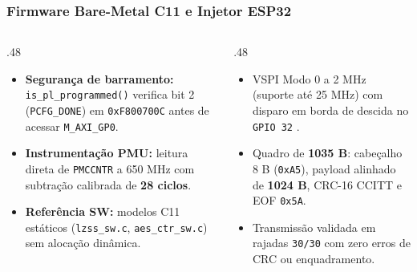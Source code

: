 \documentclass[../main.tex]{subfiles}
\begin{document}
\begin{frame}
  \frametitle{Firmware Bare-Metal C11 e Injetor ESP32}
  \begin{columns}[T]
    \begin{column}{.48\textwidth}
      \begin{itemize}
        \item \textbf{Seguran\c{c}a de barramento:} \texttt{is\_pl\_programmed()} verifica bit 2 (\texttt{PCFG\_DONE}) em \texttt{0xF800700C} antes de acessar \texttt{M\_AXI\_GP0}.
        \item \textbf{Instrumenta\c{c}\~ao PMU:} leitura direta de \texttt{PMCCNTR} a 650 MHz com subtra\c{c}\~ao calibrada de \textbf{28 ciclos}.
        \item \textbf{Refer\^encia SW:} modelos C11 est\'aticos (\texttt{lzss\_sw.c}, \texttt{aes\_ctr\_sw.c}) sem aloca\c{c}\~ao din\^amica.
      \end{itemize}
    \end{column}
    \begin{column}{.48\textwidth}
      \begin{pontoschave}
        \begin{itemize}
          \item VSPI Modo 0 a 2 MHz (suporte at\'e 25 MHz) com disparo em borda de descida no \texttt{GPIO 32} \autocite{EspressifESPIDF}.
          \item Quadro de \textbf{1035 B}: cabe\c{c}alho 8 B (\texttt{0xA5}), payload alinhado de \textbf{1024 B}, CRC-16 CCITT e EOF \texttt{0x5A}.
          \item Transmiss\~ao validada em rajadas \texttt{30/30} com zero erros de CRC ou enquadramento.
        \end{itemize}
      \end{pontoschave}
    \end{column}
  \end{columns}
\end{frame}
\end{document}

